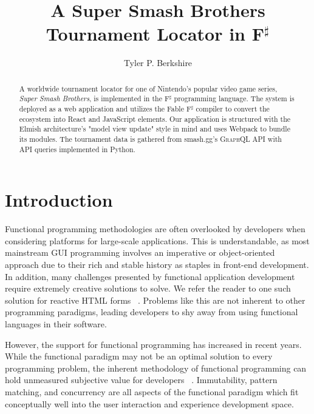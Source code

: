 \documentclass[sigconf]{acmart}
\begin{document}
\title{A Super Smash Brothers Tournament Locator in F$^{\sharp}$}
\author{Tyler P. Berkshire}

\renewcommand{\shortauthors}{T.P. Berkshire}

\begin{abstract}
A worldwide tournament locator for one of Nintendo's popular video game series, \textit{Super Smash Brothers}, is implemented in the F$^{\sharp}$ programming language. The system is deployed as a web application and utilizes the Fable F$^{\sharp}$ compiler to convert the ecosystem into React and JavaScript elements. Our application is structured with the Elmish architecture's "model view update" style in mind and uses Webpack to bundle its modules. The tournament data is gathered from smash.gg's \textsc{GraphQL API} with \textsc{API} queries implemented in Python.
\end{abstract}


\maketitle

\section{Introduction}

Functional programming methodologies are often overlooked by developers when considering platforms for large-scale applications. This is understandable, as most mainstream \textsc{GUI} programming involves an imperative or object-oriented approach due to their rich and stable history as staples in front-end development. In addition, many challenges presented by functional application development require extremely creative solutions to solve. We refer the reader to one such solution for reactive \textsc{HTML} forms ~\cite{reactive}. Problems like this are not inherent to other programming paradigms, leading developers to shy away from using functional languages in their software.

However, the support for functional programming has increased in recent years. While the functional paradigm may not be an optimal solution to every programming problem, the inherent methodology of functional programming can hold unmeasured subjective value for developers ~\cite{testing}. Immutability, pattern matching, and concurrency are all aspects of the functional paradigm which fit conceptually well into the user interaction and experience development space.
\end{document}
